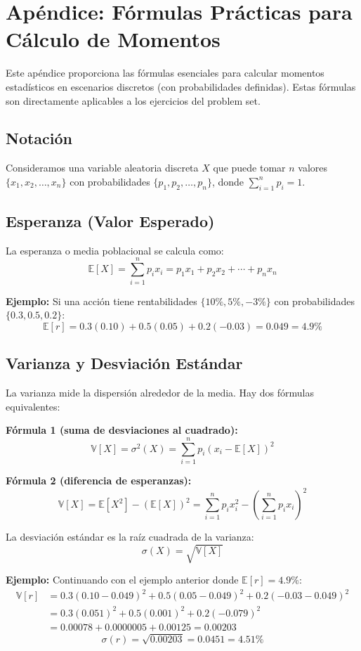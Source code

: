 \documentclass[12pt,a4paper]{article}
\newcommand{\E}{\mathbb{E}}
\newcommand{\V}{\mathbb{V}}
\begin{document}
\newpage
\appendix

\section*{Apéndice: Fórmulas Prácticas para Cálculo de Momentos}

Este apéndice proporciona las fórmulas esenciales para calcular momentos estadísticos en escenarios discretos (con probabilidades definidas). Estas fórmulas son directamente aplicables a los ejercicios del problem set.

\subsection*{Notación}

Consideramos una variable aleatoria discreta $X$ que puede tomar $n$ valores $\{x_1, x_2, \ldots, x_n\}$ con probabilidades $\{p_1, p_2, \ldots, p_n\}$, donde $\sum_{i=1}^n p_i = 1$.

\subsection*{Esperanza (Valor Esperado)}

La esperanza o media poblacional se calcula como:
\[
\E[X] = \sum_{i=1}^{n} p_i x_i = p_1 x_1 + p_2 x_2 + \cdots + p_n x_n
\]

\textbf{Ejemplo:} Si una acción tiene rentabilidades $\{10\%, 5\%, -3\%\}$ con probabilidades $\{0.3, 0.5, 0.2\}$:
\[
\E[r] = 0.3(0.10) + 0.5(0.05) + 0.2(-0.03) = 0.049 = 4.9\%
\]

\subsection*{Varianza y Desviación Estándar}

La varianza mide la dispersión alrededor de la media. Hay dos fórmulas equivalentes:

\textbf{Fórmula 1 (suma de desviaciones al cuadrado):}
\[
\V[X] = \sigma^2(X) = \sum_{i=1}^{n} p_i (x_i - \E[X])^2
\]

\textbf{Fórmula 2 (diferencia de esperanzas):}
\[
\V[X] = \E[X^2] - (\E[X])^2 = \sum_{i=1}^{n} p_i x_i^2 - \left(\sum_{i=1}^{n} p_i x_i\right)^2
\]

La desviación estándar es la raíz cuadrada de la varianza:
\[
\sigma(X) = \sqrt{\V[X]}
\]

\textbf{Ejemplo:} Continuando con el ejemplo anterior donde $\E[r] = 4.9\%$:
\begin{align*}
\V[r] &= 0.3(0.10 - 0.049)^2 + 0.5(0.05 - 0.049)^2 + 0.2(-0.03 - 0.049)^2\\
      &= 0.3(0.051)^2 + 0.5(0.001)^2 + 0.2(-0.079)^2\\
      &= 0.00078 + 0.0000005 + 0.00125 = 0.00203
\end{align*}
\[
\sigma(r) = \sqrt{0.00203} = 0.0451 = 4.51\%
\]
\end{document}
